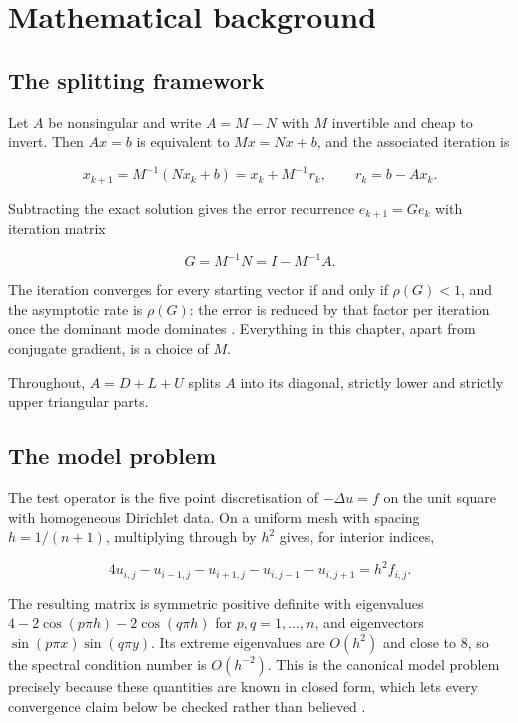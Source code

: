 \chapter{Mathematical background}
\label{ch:background}

\section{The splitting framework}

Let $A$ be nonsingular and write $A = M - N$ with $M$ invertible and cheap to
invert. Then $Ax = b$ is equivalent to $Mx = Nx + b$, and the associated
iteration is

\begin{equation}
  x_{k+1} = M^{-1}\left(N x_k + b\right) = x_k + M^{-1} r_k,
  \qquad r_k = b - A x_k .
  \label{eq:splitting}
\end{equation}

Subtracting the exact solution gives the error recurrence
$e_{k+1} = G e_k$ with iteration matrix

\begin{equation}
  G = M^{-1} N = I - M^{-1} A .
  \label{eq:iteration-matrix}
\end{equation}

The iteration converges for every starting vector if and only if
$\rho(G) < 1$, and the asymptotic rate is $\rho(G)$: the error is reduced by
that factor per iteration once the dominant mode dominates
\cite[Ch.~4]{saad2003}. Everything in this chapter, apart from conjugate
gradient, is a choice of $M$.

Throughout, $A = D + L + U$ splits $A$ into its diagonal, strictly lower and
strictly upper triangular parts.

\section{The model problem}

The test operator is the five point discretisation of $-\Delta u = f$ on the
unit square with homogeneous Dirichlet data. On a uniform mesh with spacing
$h = 1/(n+1)$, multiplying through by $h^2$ gives, for interior indices,

\begin{equation}
  4 u_{i,j} - u_{i-1,j} - u_{i+1,j} - u_{i,j-1} - u_{i,j+1} = h^2 f_{i,j} .
  \label{eq:stencil}
\end{equation}

The resulting matrix is symmetric positive definite with eigenvalues
$4 - 2\cos(p \pi h) - 2\cos(q \pi h)$ for $p, q = 1, \dots, n$, and
eigenvectors $\sin(p \pi x)\sin(q \pi y)$. Its extreme eigenvalues are
$O(h^2)$ and close to $8$, so the spectral condition number is $O(h^{-2})$.
This is the canonical model problem precisely because these quantities are known
in closed form, which lets every convergence claim below be checked rather than
believed \cite[Sec.~11.2]{golub2013}.

